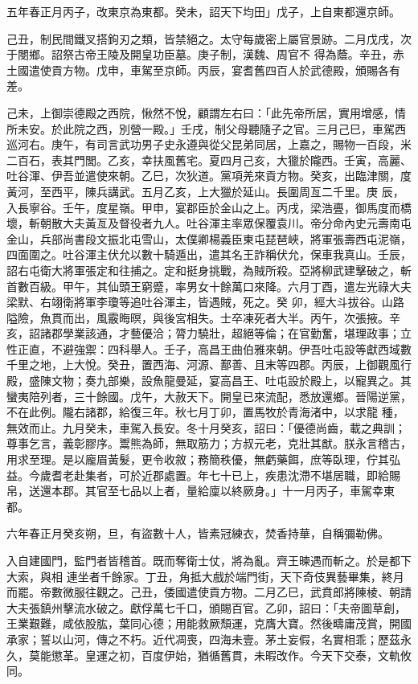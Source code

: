 \begin{pinyinscope}
 五年春正月丙子，改東京為東都。癸未，詔天下均田」戊子，上自東都還京師。



 己丑，制民間鐵叉搭鉤刃之類，皆禁絕之。太守每歲密上屬官景跡。二月戊戌，次于閿鄉。詔祭古帝王陵及開皇功臣墓。庚子制，漢魏、周官不
 得為蔭。辛丑，赤土國遣使貢方物。戊申，車駕至京師。丙辰，宴耆舊四百人於武德殿，頒賜各有差。



 己未，上御崇德殿之西院，愀然不悅，顧謂左右曰：「此先帝所居，實用增感，情所未安。於此院之西，別營一殿。」壬戌，制父母聽隨子之官。三月己巳，車駕西巡河右。庚午，有司言武功男子史永遵與從父昆弟同居，上嘉之，賜物一百段，米二百石，表其門閭。乙亥，幸扶風舊宅。夏四月己亥，大獵於隴西。壬寅，高麗、吐谷渾、伊吾並遣使來朝。乙巳，次狄道。黨項羌來貢方物。癸亥，出臨津關，度黃河，至西平，陳兵講武。五月乙亥，上大獵於延山。長圍周亙二千里。庚
 辰，入長寧谷。壬午，度星嶺。甲申，宴郡臣於金山之上。丙戌，梁浩亹，御馬度而橋壞，斬朝散大夫黃亙及督役者九人。吐谷渾主率眾保覆袁川。帝分命內史元壽南屯金山，兵部尚書段文振北屯雪山，太僕卿楊義臣東屯琵琶峽，將軍張壽西屯泥嶺，四面圍之。吐谷渾主伏允以數十騎遁出，遣其名王詐稱伏允，保車我真山。壬辰，詔右屯衛大將軍張定和往捕之。定和挺身挑戰，為賊所殺。亞將柳武建擊破之，斬首數百級。甲午，其仙頭王窮蹙，率男女十餘萬口來降。六月丁酉，遣左光祿大夫梁默、右翊衛將軍李瓊等追吐谷渾主，皆遇賊，死之。癸
 卯，經大斗拔谷。山路隘險，魚貫而出，風霰晦暝，與後宮相失。士卒凍死者大半。丙午，次張掖。辛亥，詔諸郡學業該通，才藝優洽；膂力驍壯，超絕等倫；在官勤奮，堪理政事；立性正直，不避強禦：四科舉人。壬子，高昌王曲伯雅來朝。伊吾吐屯設等獻西域數千里之地，上大悅。癸丑，置西海、河源、鄯善、且末等四郡。丙辰，上御觀風行殿，盛陳文物；奏九部樂，設魚龍曼延，宴高昌王、吐屯設於殿上，以寵異之。其蠻夷陪列者，三十餘國。戊午，大赦天下。開皇已來流配，悉放還鄉。晉陽逆黨，不在此例。隴右諸郡，給復三年。秋七月丁卯，置馬牧於青海渚中，以求龍
 種，無效而止。九月癸未，車駕入長安。冬十月癸亥，詔曰：「優德尚齒，載之典訓；尊事乞言，義彰膠序。鬻熊為師，無取筋力；方叔元老，克壯其猷。朕永言稽古，用求至理。是以龐眉黃髮，更令收敘；務簡秩優，無虧藥餌，庶等臥理，佇其弘益。今歲耆老赴集者，可於近郡處置。年七十已上，疾患沈滯不堪居職，即給賜帛，送還本郡。其官至七品以上者，量給廩以終厥身。」十一月丙子，車駕幸東都。



 六年春正月癸亥朔，旦，有盜數十人，皆素冠練衣，焚香持華，自稱彌勒佛。



 入自建國門，監門者皆稽首。既而奪衛士仗，將為亂。齊王暕遇而斬之。於是都下大索，與相
 連坐者千餘家。丁丑，角抵大戲於端門街，天下奇伎異藝畢集，終月而罷。帝數微服往觀之。己丑，倭國遣使貢方物。二月乙巳，武賁郎將陳棱、朝請大夫張鎮州擊流水破之。獻俘萬七千口，頒賜百官。乙卯，詔曰：「夫帝圖草創，王業艱難，咸依股肱，葉同心德；用能救厥頹運，克膺大寶。然後疇庸茂賞，開國承家；誓以山河，傳之不朽。近代凋喪，四海未壹。茅土妄假，名實相乖；歷茲永久，莫能懲革。皇運之初，百度伊始，猶循舊貫，未暇改作。今天下交泰，文軌攸同。




\end{pinyinscope}
